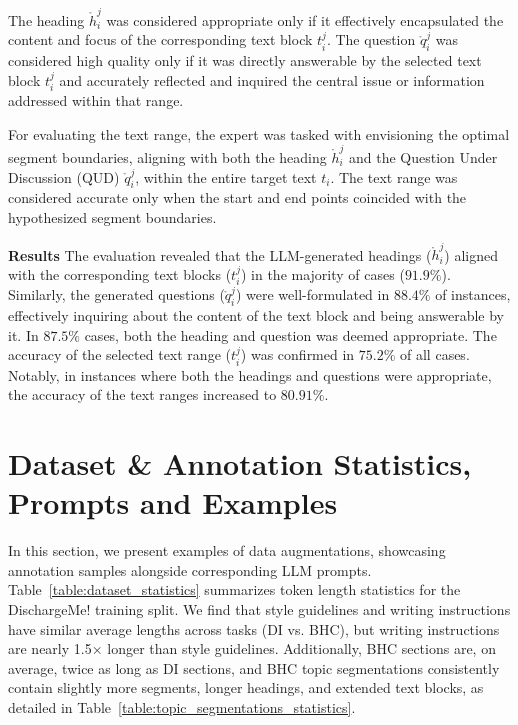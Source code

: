 The heading $\mathring{h}_i^j$ was considered appropriate only if it effectively encapsulated the content and focus of the corresponding text block $t_i^j$. The question $\mathring{q}_i^j$ was considered high quality only if it was directly answerable by the selected text block $t_i^j$ and accurately reflected and inquired the central issue or information addressed within that range.

For evaluating the text range, the expert was tasked with envisioning the optimal segment boundaries, aligning with both the heading $\mathring{h}_i^j$ and the Question Under Discussion (QUD) $\mathring{q}_i^j$, within the entire target text $t_i$. The text range was considered accurate only when the start and end points coincided with the hypothesized segment boundaries.

\textbf{Results} The evaluation revealed that the LLM-generated headings ($\mathring{h}_i^j$) aligned with the corresponding text blocks ($t_i^j$) in the majority of cases ($91.9\%$). Similarly, the generated questions ($\mathring{q}_i^j$) were well-formulated in $88.4\%$ of instances, effectively inquiring about the content of the text block and being answerable by it. In $87.5\%$ cases, both the heading and question was deemed appropriate. The accuracy of the selected text range ($t_i^j$) was confirmed in $75.2\%$ of all cases. Notably, in instances where both the headings and questions were appropriate, the accuracy of the text ranges increased to $80.91\%$.



\section{Dataset \& Annotation Statistics, Prompts and Examples}
In this section, we present examples of data augmentations, showcasing annotation samples alongside corresponding LLM prompts.
Table~\ref{table:dataset_statistics} summarizes token length statistics for the DischargeMe! training split. We find that style guidelines and writing instructions have similar average lengths across tasks (DI vs. BHC), but writing instructions are nearly 1.5× longer than style guidelines. Additionally, BHC sections are, on average, twice as long as DI sections, and BHC topic segmentations consistently contain slightly more segments, longer headings, and extended text blocks, as detailed in Table~\ref{table:topic_segmentations_statistics}.
 
